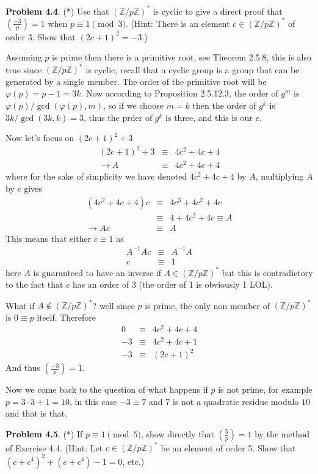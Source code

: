 \documentclass[aps,preprint,preprintnumbers,nofootinbib,showpacs,prd]{revtex4-1}
\newcommand{\nbea}{\begin{eqnarray*}}
\newcommand{\neea}{\end{eqnarray*}}
\begin{document}
{\bf Problem 4.4}. (*) Use that $(\mathbb{Z}/p\mathbb{Z})^*$ is cyclic to give a direct proof that $\left (\frac{-3}{p} \right ) = 1$ when $p \equiv 1 \pmod{3}$. (Hint: There is an element $c \in (\mathbb{Z}/p\mathbb{Z})^*$ of order 3. Show that $(2c + 1)^2 = -3$.)

Assuming $p$ is prime then there is a primitive root, see Theorem 2.5.8, this is also true since $(\mathbb{Z}/p\mathbb{Z})^*$ is cyclic, recall that a cyclic group is a group that can be generated by a single member. The order of the primitive root will be $\varphi(p) = p - 1 = 3k$. Now according to Proposition 2.5.12.3, the order of $g^m$ is $\varphi(p)/\gcd(\varphi(p),m)$, so if we choose $m = k$ then the order of $g^k$ is $3k/\gcd(3k,k) = 3$, thus the prder of $g^k$ is three, and this is our $c$.

Now let's focus on $(2c + 1)^2 + 3$
%
\nbea
(2c + 1)^2 + 3 & \equiv & 4c^2 + 4c + 4 \\
\to A & \equiv & 4c^2 + 4c + 4
\neea
%
where for the sake of simplicity we have denoted $4c^2 + 4c + 4$ by $A$, multiplying $A$ by $c$ gives
%
\nbea
(4c^2 + 4c + 4)c & \equiv & 4c^3 + 4c^2 + 4c \\
& \equiv & 4 + 4c^2 + 4c \equiv A \\
\to Ac & \equiv & A
\neea
%
This means that either $c \equiv 1$ as
%
\nbea
A^{-1}A c & \equiv & A^{-1}A \\
c & \equiv & 1
\neea
%
here $A$ is guaranteed to have an inverse if $A \in (\mathbb{Z}/p\mathbb{Z})^*$ but this is contradictory to the fact that $c$ has an order of 3 (the order of 1 is obviously 1 LOL).

What if $A \not\in (\mathbb{Z}/p\mathbb{Z})^*$? well since $p$ is prime, the only non member of $(\mathbb{Z}/p\mathbb{Z})^*$ is $0 \equiv p$ itself. Therefore
%
\nbea
0 & \equiv & 4c^2 + 4c + 4 \\
-3 & \equiv & 4c^2 + 4c + 1 \\
-3 & \equiv & (2c+1)^2
\neea
%
And thus $\left (\frac{-3}{p} \right ) = 1$.

Now we come back to the question of what happens if $p$ is not prime, for example $p = 3 \cdot 3 + 1 = 10$, in this case $-3 \equiv 7$ and $7$ is not a quadratic residue modulo $10$ and that is that.

{\bf Problem 4.5}. (*) If $p \equiv 1 \pmod{5}$, show directly that $\left (\frac{5}{p} \right ) = 1$ by the method of Exercise 4.4. (Hint: Let $c \in (\mathbb{Z}/p\mathbb{Z})^*$ be an element of order 5. Show that $(c + c^4)^2 + (c + c^4) - 1 = 0$, etc.) 
\end{document}
